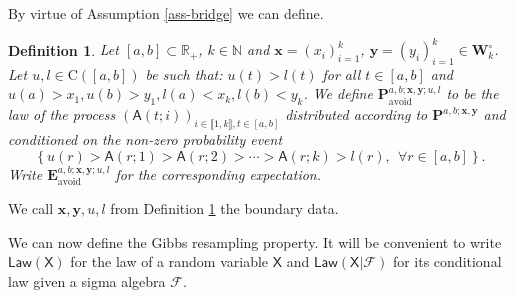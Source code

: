 \documentclass[]{article}
\newtheorem{defn}[thm]{Definition}
\begin{document}
By virtue of Assumption \ref{ass-bridge} we can define.

\begin{defn}\label{DefAvoidingBridges}
Let $[a,b]\subset \mathbb{R}_+$, $k\in \mathbb{N}$ and $\mathbf{x}=(x_i)_{i=1}^k$, $\mathbf{y}=(y_i)_{i=1}^k\in \mathbf{W}_{k}^\circ$. Let $u, l \in \mathrm{C}([a,b])$ be such that: $u(t)>l(t)$ for all $t\in [a,b]$ and $u(a)>x_1, u(b)>y_1, l(a)<x_k, l(b)<y_k$. We define $\mathbf{P}_{\mathrm{avoid}}^{a,b;\mathbf{x},\mathbf{y};u,l}$ to be the law of the process $(\mathsf{A}(t;i))_{i\in \llbracket 1, k \rrbracket,t\in [a,b]}$ distributed according to $\mathbf{P}^{a,b;\mathbf{x},\mathbf{y}}$ and conditioned on the non-zero probability event
\begin{equation*}
\left\{u(r)>\mathsf{A}(r;1)>\mathsf{A}(r;2)>\cdots >\mathsf{A}(r;k)>l(r), \ \ \forall r\in [a,b]\right\}.
\end{equation*}
Write $\mathbf{E}_{\mathrm{avoid}}^{a,b;\mathbf{x},\mathbf{y};u,l}$ for the corresponding expectation.
\end{defn}

We call $\mathbf{x}, \mathbf{y},u,l$ from Definition \ref{DefAvoidingBridges} the boundary data.

We can now define the Gibbs resampling property. It will be convenient to write $\mathsf{Law}(\mathsf{X})$ for the law of a random variable $\mathsf{X}$ and $\mathsf{Law}(\mathsf{X}|\mathscr{F})$ for its conditional law given a sigma algebra $\mathscr{F}$.
\end{document}
